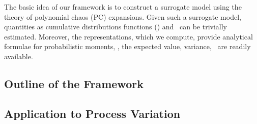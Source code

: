 The basic idea of our framework is to construct a surrogate model using the theory of polynomial chaos (PC) expansions. Given such a surrogate model, quantities as cumulative distributions functions (\cdfs) and \pdfs\ can be trivially estimated. Moreover, the representations, which we compute, provide analytical formulae for probabilistic moments, \ie, the expected value, variance, \etc\ are readily available.

\subsection{Outline of the Framework}


\subsection{Application to Process Variation} 

